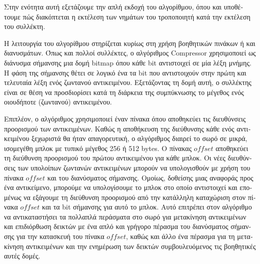 \begin{greek}
Στην ενότητα
αυτή εξετάζουμε την απλή εκδοχή του αλγορίθμου, όπου και υποθέτουμε πώς
διακόπτεται η εκτέλεση των νημάτων του τροποποιητή κατά την εκτέλεση του
συλλέκτη.

Η λειτουργία του αλγορίθμου στηρίζεται κυρίως στη χρήση βοηθητικών πινάκων ή και
διανυσμάτων. Όπως και πολλοί συλλέκτες, ο αλγόριθμος Compressor χρησιμοποιεί ως
διάνυσμα σήμανσης μια δομή bitmap όπου κάθε bit αντιστοιχεί σε μία λέξη μνήμης. 
Η φάση της σήμανσης θέτει σε λογικό ένα τα bit που αντιστοιχούν στην πρώτη και 
τελευταία λέξη ενός ζωντανού αντικειμένου. Εξετάζοντας τη δομή αυτή, ο συλλέκτης 
είναι σε θέση να προσδιορίσει κατά τη διάρκεια της συμπύκνωσης το μέγεθος ενός 
οιουδήποτε (ζωντανού) αντικειμένου.

Επιπλέον, ο αλγόριθμος χρησιμοποιεί έναν πίνακα όπου αποθηκεύει τις διευθύνσεις
προορισμού των αντικειμένων. Καθώς η αποθήκευση της διεύθυνσης κάθε ενός
αντικειμένου ξεχωριστά θα ήταν απαγορευτική, ο αλγόριθμος διαιρεί το σωρό σε
μικρά, ισομεγέθη μπλοκ με τυπικό μέγεθος 256 ή 512 bytes. Ο πίνακας $offset$
αποθηκεύει τη διεύθυνση προορισμού του πρώτου αντικειμένου για κάθε μπλοκ.
Οι νέες διευθύνσεις των υπολοίπων ζωντανών αντικειμένων μπορούν να υπολογισθούν
με χρήση του πίνακα $offset$ και του διανύσματος σήμανσης. Ομοίως, δοθείσης μιας 
αναφοράς προς ένα αντικείμενο, μπορούμε να υπολογίσουμε το μπλοκ στο οποίο
αντιστοιχεί και επομένως να εξάγουμε τη διεύθυνση προορισμού από την κατάλληλη
καταχώριση στον πίνακα $offset$ και τα bit σήμανσης για αυτό το μπλοκ. Αυτό
επιτρέπει στον αλγόριθμο να αντικαταστήσει τα πολλαπλά περάσματα στο σωρό για
μετακίνηση αντικειμένων και επιδιόρθωση δεικτών με ένα απλό και γρήγορο πέρασμα
του διανύσματος σήμανσης για την κατασκευή του πίνακα $offset$, καθώς και άλλο 
ένα πέρασμα για τη μετακίνηση αντικειμένων και την ενημέρωση των δεικτών 
συμβουλευόμενος τις βοηθητικές αυτές δομές.


\end{greek}
